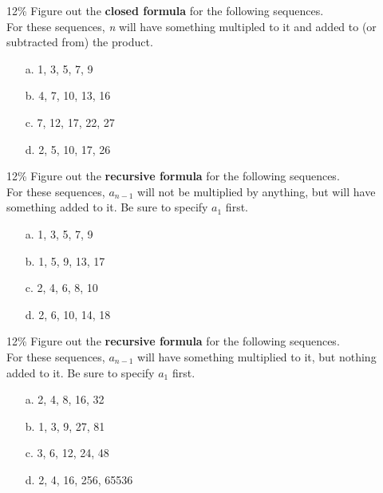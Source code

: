\documentclass[a4paper,12pt]{book}
\begin{document}
        \begin{question}{5}{12\%}
            Figure out the \textbf{closed formula} for the following sequences. \\
            For these sequences, \textit{n} will have something multipled to it
            and added to (or subtracted from) the product.

            \begin{itemize}
                \item[a.] 1, 3, 5, 7, 9
                \item[b.] 4, 7, 10, 13, 16
                \item[c.] 7, 12, 17, 22, 27
                \item[d.] 2, 5, 10, 17, 26
            \end{itemize}
        \end{question}

        \newpage
        \begin{question}{6}{12\%}
            Figure out the \textbf{recursive formula} for the following sequences. \\
            For these sequences, $a_{n-1}$ will not be multiplied by anything,
            but will have something added to it.
            Be sure to specify $a_{1}$ first.

            \begin{itemize}
                \item[a.] 1, 3, 5, 7, 9
                \item[b.] 1, 5, 9, 13, 17
                \item[c.] 2, 4, 6, 8, 10
                \item[d.] 2, 6, 10, 14, 18
            \end{itemize}
        \end{question}

        \begin{question}{7}{12\%}
            Figure out the \textbf{recursive formula} for the following sequences. \\
            For these sequences, $a_{n-1}$ will have something multiplied to
            it, but nothing added to it.
            Be sure to specify $a_{1}$ first.

            \begin{itemize}
                \item[a.] 2, 4, 8, 16, 32
                \item[b.] 1, 3, 9, 27, 81
                \item[c.] 3, 6, 12, 24, 48
                \item[d.] 2, 4, 16, 256, 65536
            \end{itemize}
        \end{question}
        
\end{document}
